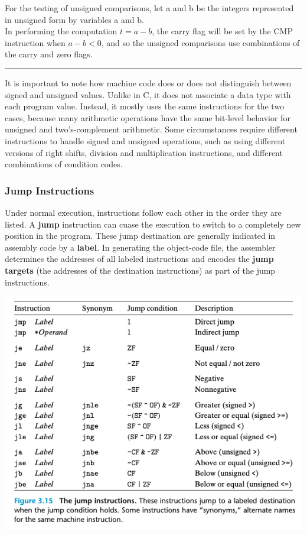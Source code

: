\documentclass[11pt]{article}
\begin{document}
For the testing of unsigned comparisons, let a and b be the integers represented in unsigned form by variables a and b.\\
In performing the computation \(t = a-b\), the carry flag will be set by the CMP instruction when \(a-b<0\), and so the unsigned comparisons use combinations of the carry and zero flags.\\

\noindent\rule{\textwidth}{0.5pt}

It is important to note how machine code does or does not distinguish between signed and unsigned values. Unlike in C, it does not associate a data type with each program value. Instead, it mostly uses the same instructions for the two cases, because many arithmetic operations have the same bit-level behavior for unsigned and two’s-complement arithmetic. Some circumstances require different instructions to handle signed and unsigned operations, such as using different versions of right shifts, division and multiplication instructions, and different combinations of condition codes.\\

\subsubsection{Jump Instructions}
\label{sec:orgf3a9dcf}
Under normal execution, instructions follow each other in the order they are listed. A \textbf{jump} instruction can cuase the execution to switch to a completely new position in the program. These jump destination are generally indicated in assembly code by a \textbf{label}. In generating the object-code file, the assembler determines the addresses of all labeled instructions and encodes the \textbf{jump targets} (the addresses of the destination instructions) as part of the jump instructions.\\


\begin{center}
\includegraphics[width=.9\linewidth]{pics/the-jump-instructions.png}
\end{center}
\end{document}
